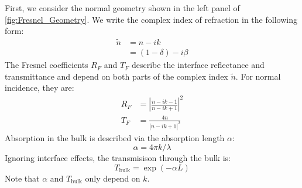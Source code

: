 First, we consider the normal geometry shown in the left panel of \cref{fig:Fresnel_Geometry}. We write the complex index of refraction in the following form:
\begin{equation}
\begin{aligned}
\tilde{n} &= n - i k \\
&= (1-\delta) - i \beta
\end{aligned}
\label{eqn:complex_index}
\end{equation}
The Fresnel coefficients $R_F$ and $T_F$ describe the interface reflectance and transmittance and depend on both parts of the complex index $\tilde{n}$. For normal incidence, they are:
\begin{equation}
\begin{aligned}
R_F &= \left| \frac{n-ik-1}{n-ik+1}   \right|^2 \\
T_F &=  \frac{4n}{\left|n-ik+1\right|^2}
\end{aligned}
\label{eqn:fresnel_normal}
\end{equation}
Absorption in the bulk is described via the absorption length $\alpha$:
\begin{equation}
\alpha = 4 \pi k / \lambda
\end{equation}
Ignoring interface effects, the transmisison through the bulk is:
\begin{equation}
T_{\text{bulk}} = \exp( - \alpha L)
\end{equation}
Note that $\alpha$ and $T_{\text{bulk}}$ only depend on $k$.


